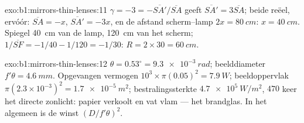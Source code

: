 \begin{solution}{exo:b1:mirrors-thin-lenses:11}
$\gamma = -3 = -\overline{SA'}/\overline{SA}$ geeft $\overline{SA'} =
3\overline{SA}$; beide reëel, ervóór: $\overline{SA} = -x$,
$\overline{SA'} = -3x$, en de afstand scherm--lamp $2x = \qty{80}{cm}$:
$x = \qty{40}{cm}$. Spiegel \qty{40}{cm} van de lamp, \qty{120}{cm}
van het scherm; $1/\overline{SF} = -1/40 - 1/120 = -1/30$:
$R = 2 \times 30 = \qty{60}{cm}$.
\end{solution}

\begin{solution}{exo:b1:mirrors-thin-lenses:12}
$\theta = 0.53^\circ = \qty{9.3e-3}{rad}$; beelddiameter $f'\theta =
\qty{4.6}{mm}$. Opgevangen vermogen $10^3 \times \pi(0.05)^2 = \qty{7.9}{W}$;
beeldoppervlak $\pi(2.3\times10^{-3})^2 = \qty{1.7e-5}{m^2}$; bestralingssterkte
$\qty{4.7e5}{W/m^2}$, $470$ keer het directe zonlicht: papier verkoolt en
vat vlam --- het brandglas. In het algemeen is de winst
$(D/f'\theta)^2$.
\end{solution}

